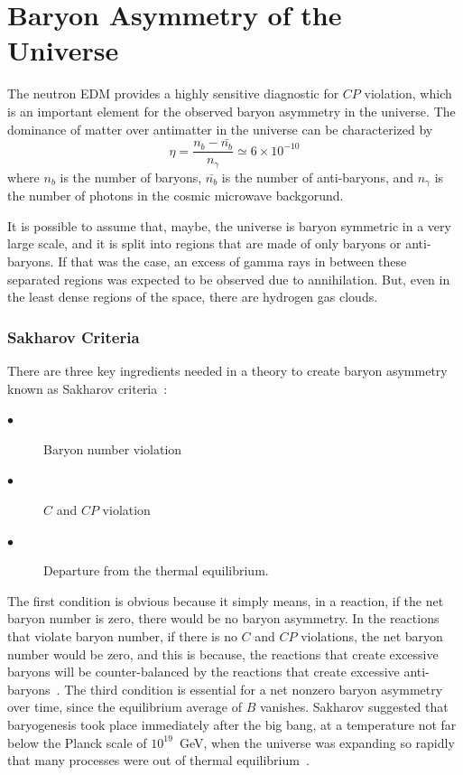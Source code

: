 \section{Baryon Asymmetry of the Universe}
The neutron EDM provides a highly sensitive diagnostic for $CP$
violation, which is an important element for the observed
baryon asymmetry in the universe. The dominance of matter over
antimatter in the universe can be characterized by~\cite{Cline}
\begin{equation}
\eta = \frac{n_b-\bar{n_b}}{n_{\gamma}} \simeq 6 \times 10^{-10}
\end{equation}
where $n_b$ is the number of baryons, $\bar{n_b}$ is the number of
anti-baryons, and $n_{\gamma}$ is the number of photons in the cosmic
microwave backgorund.

It is possible to assume that, maybe, the universe is baryon symmetric
in a very large scale, and it is split into regions that are made of
only baryons or anti-baryons. If that was the case, an excess of gamma
rays in between these separated regions was expected to be observed
due to annihilation. But, even in the least dense regions of the
space, there are hydrogen gas clouds.

\subsubsection{Sakharov Criteria}
There are three key ingredients needed in a theory to create baryon
asymmetry known as Sakharov criteria~\cite{Sakharov:1967dj}:
\begin{center}
\begin{description}
\item[$\bullet$]Baryon number violation
\item[$\bullet$] $C$ and $CP$ violation
\item[$\bullet$] Departure from the thermal equilibrium.
\end{description}
\end{center}

The first condition is obvious because it simply means, in a reaction,
if the net baryon number is zero, there would be no baryon
asymmetry. In the reactions that violate baryon number, if there is no
$C$ and $CP$ violations, the net baryon number would be zero, and this
is because, the reactions that create excessive baryons will be
counter-balanced by the reactions that create excessive
anti-baryons~\cite{theearlyuniverse}. The third condition is essential
for a net nonzero baryon asymmetry over time, since the equilibrium
average of $B$ vanishes. Sakharov suggested that baryogenesis took
place immediately after the big bang, at a temperature not far below
the Planck scale of $10^{19}$~GeV, when the universe was expanding so
rapidly that many processes were out of thermal
equilibrium~\cite{cohen1993progress}.

